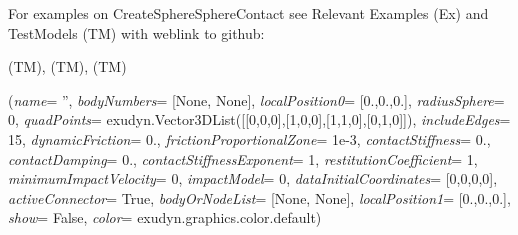 %
\noindent For examples on CreateSphereSphereContact see Relevant Examples (Ex) and TestModels (TM) with weblink to github:
\bi
 \item \footnotesize {} (TM), 
 (TM), 
 (TM)
\ei

%
\begin{flushleft}
\label{sec:mainsystemextensions:CreateSphereQuadContact}
({\it name}= '', {\it bodyNumbers}= [None, None], {\it localPosition0}= [0.,0.,0.], {\it radiusSphere}= 0, {\it quadPoints}= exudyn.Vector3DList([[0,0,0],[1,0,0],[1,1,0],[0,1,0]]), {\it includeEdges}= 15, {\it dynamicFriction}= 0., {\it frictionProportionalZone}= 1e-3, {\it contactStiffness}= 0., {\it contactDamping}= 0., {\it contactStiffnessExponent}= 1, {\it restitutionCoefficient}= 1, {\it minimumImpactVelocity}= 0, {\it impactModel}= 0, {\it dataInitialCoordinates}= [0,0,0,0], {\it activeConnector}= True, {\it bodyOrNodeList}= [None, None], {\it localPosition1}= [0.,0.,0.], {\it show}= False, {\it color}= exudyn.graphics.color.default)
\end{flushleft}
\setlength{\itemindent}{0.7cm}
